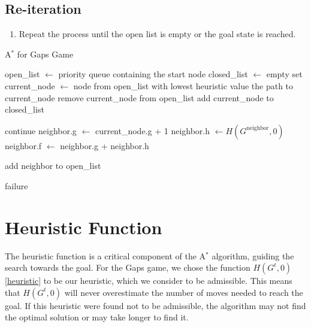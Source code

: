 \subsection{Re-iteration}
\begin{enumerate}
    \item Repeat the process until the open list is empty or the goal state is reached.
\end{enumerate}

\begin{algorithm}[H]
    \caption{A$^*$ for Gaps Game}
    \begin{algorithmic}
    \State open\_list $\gets$ priority queue containing the start node
    \State closed\_list $\gets$ empty set
    \State current\_node $\gets$ node from open\_list with lowest heuristic value
        \State \Return the path to current\_node
    \EndIf
    \State remove current\_node from open\_list
    \State add current\_node to closed\_list

            \State continue
        \EndIf
        \State neighbor.g $\gets$ current\_node.g + 1 
        \State neighbor.h $\gets H(G^{\text{neighbor}}, 0)$ 
        \State neighbor.f $\gets$ neighbor.g + neighbor.h 

            \State add neighbor to open\_list
        \EndIf
    \EndFor
\EndWhile

\State \Return failure
\end{algorithmic}
\end{algorithm}

\section{Heuristic Function}
The heuristic function is a critical component of the A$^*$ algorithm, guiding the search towards the goal. For the Gaps game, we chose the function $H\left(G^t, 0\right)$ \ref{heuristic} to be our heuristic, which we consider to be admissible. This means that $H\left(G^t, 0\right)$ will never overestimate the number of moves needed to reach the goal. If this heuristic were found not to be admissible, the algorithm may not find the optimal solution or may take longer to find it.
